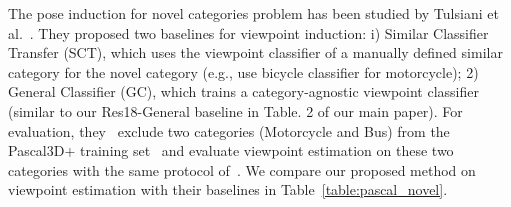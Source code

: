 \documentclass[runningheads]{llncs}
\begin{document}
\begin{table}[t]
\scriptsize
{}
{\caption{Viewpoint estimation of novel categories on Pascal3D+~\cite{xiang2014beyond}. We compare with the baselines from Tulsiani et al.~\cite{tulsiani2015pose} and our re-trained ResNet18~\cite{he2016deep} model. The results are shown in $\mathit{Acc}_\frac{\pi}{6}$.}
\label{table:pascal_novel}}
\vspace{-0.6cm}
\end{table}

The pose induction for novel categories problem has been studied by Tulsiani et al.~\cite{tulsiani2015pose}.
They proposed two baselines for viewpoint induction: i) Similar Classifier Transfer (SCT), which uses the viewpoint classifier of a manually defined similar category for the novel category (e.g., use bicycle classifier for motorcycle); 
2) General Classifier (GC),  which trains a category-agnostic viewpoint classifier (similar to our Res18-General baseline in Table. 2 of our main paper). 
For evaluation, they~\cite{tulsiani2015pose} exclude two categories (Motorcycle and Bus) from the Pascal3D+ training set~\cite{xiang2014beyond} and evaluate viewpoint estimation on these two categories with the same protocol of~\cite{tulsiani2015viewpoints}. 
We compare our proposed method on viewpoint estimation with their baselines in Table~\ref{table:pascal_novel}. 
\end{document}
